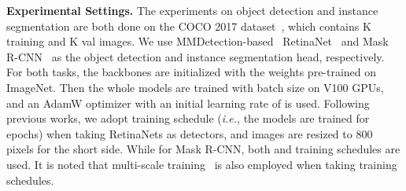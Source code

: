 \documentclass{article} \usepackage{iclr2022_conference,times}
\newcommand{\ie}{{\emph{i.e.}}}
\begin{document}
\textbf{Experimental Settings.} The experiments on object detection and instance segmentation are both done on the COCO 2017 dataset~\citep{DBLP:conf/eccv/LinMBHPRDZ14}, which contains K training and K val images.
We use MMDetection-based~\citep{mmdetection} RetinaNet~\citep{DBLP:journals/pami/LinGGHD20} and Mask R-CNN~\citep{DBLP:conf/iccv/HeGDG17} as the object detection and instance segmentation head, respectively.
For both tasks, the backbones are initialized with the weights pre-trained on ImageNet. Then the whole models are trained with batch size  on  V100 GPUs, and an AdamW optimizer with an initial learning rate of  is used. Following previous works, we adopt  training schedule (\ie, the models are trained for  epochs) when taking RetinaNets as detectors, and images are resized to 800 pixels for the short side. While for Mask R-CNN, both  and  training schedules are used. It is noted that multi-scale training~\citep{DBLP:conf/eccv/CarionMSUKZ20} is also employed when taking  training schedules.
\end{document}
